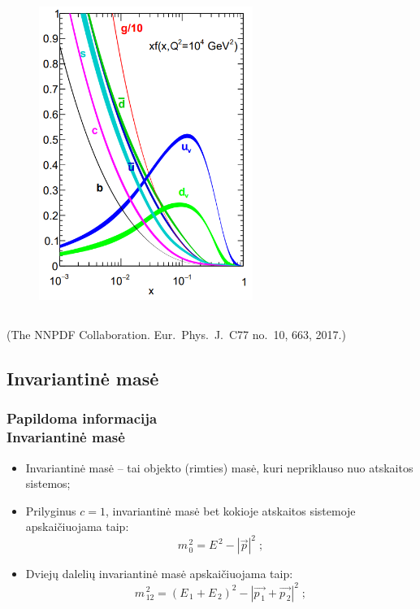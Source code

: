 \documentclass[xcolor=dvipsnames]{beamer}
\begin{document}
\begin{frame}
\begin{columns}
\begin{figure}[H]
\includegraphics[width=0.62\textwidth]{NNPDF10000.PNG}
\end{figure}
\end{columns}
\tiny (The NNPDF Collaboration. Eur.\ Phys.\ J.\ C77 no.\ 10, 663, 2017.)
\end{frame}

\begin{frame}
\subsection{Invariantinė masė}
\frametitle{Papildoma informacija\\ \small Invariantinė masė}
\begin{itemize}
\item Invariantinė masė -- tai objekto (rimties) masė, kuri nepriklauso nuo atskaitos sistemos;
\item Prilyginus $\mathit{c}=1$, invariantinė masė bet kokioje atskaitos sistemoje apskaičiuojama taip:
\begin{equation*}
\mathit{m}_{\, 0}^{\, 2}=\mathit{E}^{\, 2}-|\vec{\mathit{p}}|^{2} \; ;
\end{equation*}
\item Dviejų dalelių invariantinė masė apskaičiuojama taip:
\begin{equation*}
\mathit{m}_{\, 12}^{\, 2}=(\mathit{E}_{\, 1}+\mathit{E}_{\, 2})^{2}-|\vec{\mathit{p}_{\, 1}}+\vec{\mathit{p}_{\, 2}}|^{2} \; ;
\end{equation*}
\end{itemize}


\end{frame}
\end{document}
